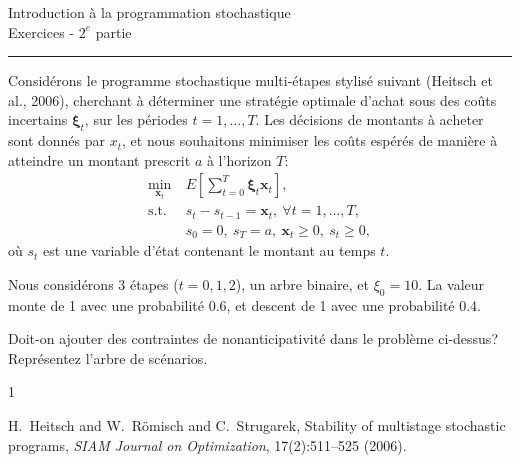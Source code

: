 \documentclass[11pt]{article}
\def\bx {\boldsymbol{x}}
\def\bxi {\boldsymbol{\xi}}
\begin{document}
\begin{center}
\Large
Introduction à la programmation stochastique\\
Exercices - $2^e$ partie
\end{center}

\mbox{}

\hrule

\mbox{}

\mbox{}

Considérons le programme stochastique multi-étapes stylisé suivant (Heitsch et al., 2006),
cherchant à déterminer une stratégie optimale d'achat sous des coûts incertains $\bxi_t$,
sur les périodes $t = 1,\ldots,T$. Les décisions de montants à acheter sont donnés par $x_t$,
et nous souhaitons minimiser les coûts espérés de manière à atteindre un montant prescrit
$a$ à l'horizon $T$:
\begin{align*}
 \min_{\bx_t}\ & E\left[ \sum_{t=0}^T \bxi_t \bx_t \right],\\
\mbox{s.t. } & s_t-s_{t-1} = \bx_t,\ \forall t = 1,\ldots,T,\\
& s_0 = 0,\ s_T = a,\ \bx_t \geq 0,\ s_t \geq 0,
\end{align*}
où $s_t$ est une variable d'état  contenant le montant au temps $t$.

Nous considérons 3 étapes ($t = 0, 1, 2$), un arbre binaire, et $\xi_0 = 10$.
La valeur monte de 1 avec une probabilité 0.6, et descent de 1 avec une probabilité 0.4.

Doit-on ajouter des contraintes de nonanticipativité dans le problème ci-dessus?
Représentez l'arbre de scénarios.

\begin{thebibliography}{1}

H.~Heitsch and W.~Römisch and C.~Strugarek, Stability of multistage stochastic
  programs, {\em SIAM Journal on Optimization}, 17(2):511--525 (2006).

\end{thebibliography}
\end{document}
